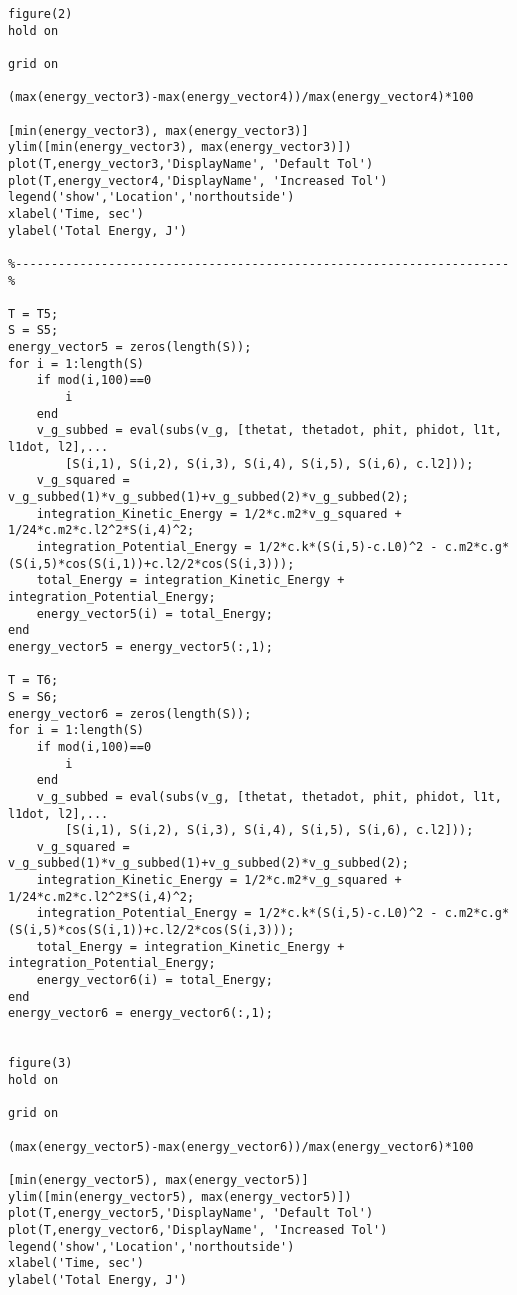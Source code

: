 \begin{lstlisting}[frame=lines,style=Matlab-editor,basicstyle = \mlttfamily]
figure(2)
hold on

grid on

(max(energy_vector3)-max(energy_vector4))/max(energy_vector4)*100

[min(energy_vector3), max(energy_vector3)]
ylim([min(energy_vector3), max(energy_vector3)])
plot(T,energy_vector3,'DisplayName', 'Default Tol')
plot(T,energy_vector4,'DisplayName', 'Increased Tol')
legend('show','Location','northoutside')
xlabel('Time, sec')
ylabel('Total Energy, J')

%---------------------------------------------------------------------%

T = T5;
S = S5;
energy_vector5 = zeros(length(S));
for i = 1:length(S)
    if mod(i,100)==0
        i
    end
    v_g_subbed = eval(subs(v_g, [thetat, thetadot, phit, phidot, l1t, l1dot, l2],...
        [S(i,1), S(i,2), S(i,3), S(i,4), S(i,5), S(i,6), c.l2]));
    v_g_squared = v_g_subbed(1)*v_g_subbed(1)+v_g_subbed(2)*v_g_subbed(2);
    integration_Kinetic_Energy = 1/2*c.m2*v_g_squared + 1/24*c.m2*c.l2^2*S(i,4)^2;
    integration_Potential_Energy = 1/2*c.k*(S(i,5)-c.L0)^2 - c.m2*c.g*(S(i,5)*cos(S(i,1))+c.l2/2*cos(S(i,3)));
    total_Energy = integration_Kinetic_Energy + integration_Potential_Energy;
    energy_vector5(i) = total_Energy;
end
energy_vector5 = energy_vector5(:,1);

T = T6;
S = S6;
energy_vector6 = zeros(length(S));
for i = 1:length(S)
    if mod(i,100)==0
        i
    end
    v_g_subbed = eval(subs(v_g, [thetat, thetadot, phit, phidot, l1t, l1dot, l2],...
        [S(i,1), S(i,2), S(i,3), S(i,4), S(i,5), S(i,6), c.l2]));
    v_g_squared = v_g_subbed(1)*v_g_subbed(1)+v_g_subbed(2)*v_g_subbed(2);
    integration_Kinetic_Energy = 1/2*c.m2*v_g_squared + 1/24*c.m2*c.l2^2*S(i,4)^2;
    integration_Potential_Energy = 1/2*c.k*(S(i,5)-c.L0)^2 - c.m2*c.g*(S(i,5)*cos(S(i,1))+c.l2/2*cos(S(i,3)));
    total_Energy = integration_Kinetic_Energy + integration_Potential_Energy;
    energy_vector6(i) = total_Energy;
end
energy_vector6 = energy_vector6(:,1);


figure(3)
hold on

grid on

(max(energy_vector5)-max(energy_vector6))/max(energy_vector6)*100

[min(energy_vector5), max(energy_vector5)]
ylim([min(energy_vector5), max(energy_vector5)])
plot(T,energy_vector5,'DisplayName', 'Default Tol')
plot(T,energy_vector6,'DisplayName', 'Increased Tol')
legend('show','Location','northoutside')
xlabel('Time, sec')
ylabel('Total Energy, J')

\end{lstlisting}
